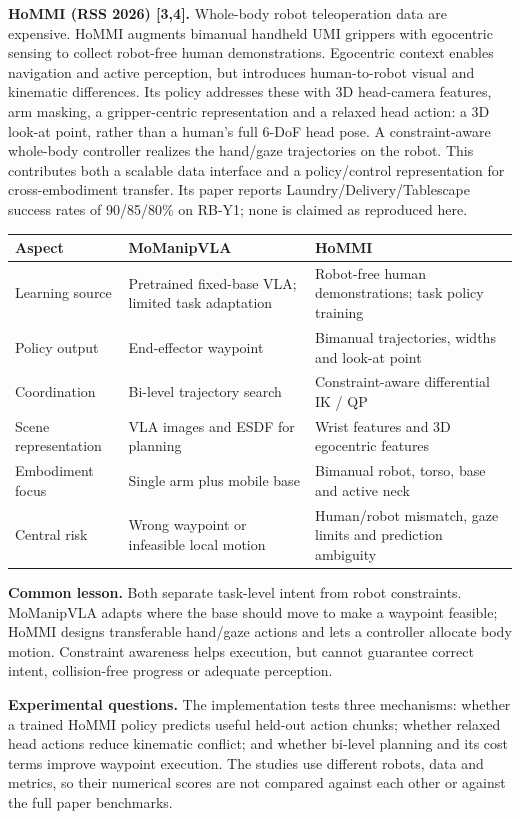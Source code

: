 \documentclass[10pt,a4paper]{article}
\begin{document}
\textbf{HoMMI (RSS 2026) [3,4].} Whole-body robot teleoperation data are expensive. HoMMI augments bimanual handheld UMI grippers with egocentric sensing to collect robot-free human demonstrations. Egocentric context enables navigation and active perception, but introduces human-to-robot visual and kinematic differences. Its policy addresses these with 3D head-camera features, arm masking, a gripper-centric representation and a relaxed head action: a 3D look-at point, rather than a human's full 6-DoF head pose. A constraint-aware whole-body controller realizes the hand/gaze trajectories on the robot. This contributes both a scalable data interface and a policy/control representation for cross-embodiment transfer. Its paper reports Laundry/Delivery/Tablescape success rates of 90/85/80\% on RB-Y1; none is claimed as reproduced here.

\begin{center}\small
\begin{tabular}{p{.22\linewidth}p{.35\linewidth}p{.35\linewidth}}\toprule
Aspect & MoManipVLA & HoMMI\\\midrule
Learning source & Pretrained fixed-base VLA; limited task adaptation & Robot-free human demonstrations; task policy training\\
Policy output & End-effector waypoint & Bimanual trajectories, widths and look-at point\\
Coordination & Bi-level trajectory search & Constraint-aware differential IK / QP\\
Scene representation & VLA images and ESDF for planning & Wrist features and 3D egocentric features\\
Embodiment focus & Single arm plus mobile base & Bimanual robot, torso, base and active neck\\
Central risk & Wrong waypoint or infeasible local motion & Human/robot mismatch, gaze limits and prediction ambiguity\\\bottomrule
\end{tabular}\end{center}

\textbf{Common lesson.} Both separate task-level intent from robot constraints. MoManipVLA adapts where the base should move to make a waypoint feasible; HoMMI designs transferable hand/gaze actions and lets a controller allocate body motion. Constraint awareness helps execution, but cannot guarantee correct intent, collision-free progress or adequate perception.

\textbf{Experimental questions.} The implementation tests three mechanisms: whether a trained HoMMI policy predicts useful held-out action chunks; whether relaxed head actions reduce kinematic conflict; and whether bi-level planning and its cost terms improve waypoint execution. The studies use different robots, data and metrics, so their numerical scores are not compared against each other or against the full paper benchmarks.
\end{document}
